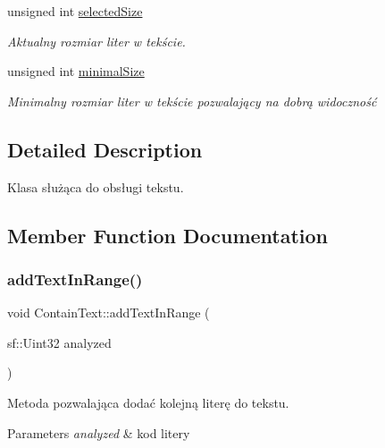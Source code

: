 \begin{DoxyCompactItemize}
\mbox{\label{class_contain_text_a2db12f9f109518d7cd82caf5eca96b23}} 
unsigned int \mbox{\hyperlink{class_contain_text_a2db12f9f109518d7cd82caf5eca96b23}{selected\+Size}}
\begin{DoxyCompactList}\small\item\em Aktualny rozmiar liter w tekście. \end{DoxyCompactList}\item 
\mbox{\label{class_contain_text_a024e33acfca2543b139bb645b2f27dbf}} 
unsigned int \mbox{\hyperlink{class_contain_text_a024e33acfca2543b139bb645b2f27dbf}{minimal\+Size}}
\begin{DoxyCompactList}\small\item\em Minimalny rozmiar liter w tekście pozwalający na dobrą widoczność \end{DoxyCompactList}\end{DoxyCompactItemize}


\subsection{Detailed Description}
Klasa służąca do obsługi tekstu. 

\subsection{Member Function Documentation}
\mbox{\label{class_contain_text_acecaf7e7bd9ada71f74d7db14aee1b8e}} 
\subsubsection{\texorpdfstring{addTextInRange()}{addTextInRange()}}
{\footnotesize\ttfamily void Contain\+Text\+::add\+Text\+In\+Range (\begin{DoxyParamCaption}\item[{sf\+::\+Uint32}]{analyzed }\end{DoxyParamCaption})\hspace{0.3cm}{\ttfamily [protected]}}



Metoda pozwalająca dodać kolejną literę do tekstu. 


\begin{DoxyParams}{Parameters}
{\em analyzed} & kod litery \\
\hline
\end{DoxyParams}
\mbox{\label{class_contain_text_ab1cecc56c7d8bbd543f7f53f552ecac0}} 
